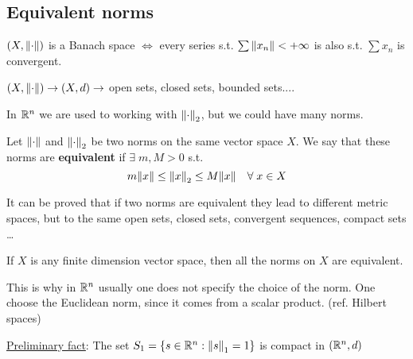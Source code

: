 \subsection{Equivalent norms}
\((X, \norm{\cdot})\) is a Banach space \(\Leftrightarrow\) every series s.t. \(\sum \norm{x_n} < +\infty\) is also s.t. \(\sum x_n\) is convergent.


\((X, \norm{\cdot}) \to (X, d) \to \) open sets, closed sets, bounded sets....

In \(\mathbb{R}^n\) we are used to working with \(\norm{\cdot}_2\), but we could have many norms.
\begin{definition}
    Let \(\norm{\cdot}\) and \(\norm{\cdot}_2\) be two norms on the same vector space \(X\). We say that these norms are \textbf{equivalent} if \(\exists \; m, M >0\) s.t. 
    \[
        m\norm{x} \leq \norm{x}_2 \leq M\norm{x} \quad \forall\; x \in X
    \]
\end{definition}
It can be proved that if two norms are equivalent they lead to different metric spaces, but to the same open sets, closed sets, convergent sequences, compact sets \dots
\begin{theorem}
    If \(X\) is any finite dimension vector space, then all the norms on \(X\) are equivalent.
\end{theorem}
\begin{remark}
    This is why in \(\mathbb{R}^n\) usually one does not specify the choice of the norm. One choose the Euclidean norm, since it comes from a scalar product. (ref. Hilbert spaces)
\end{remark}
\noindent\underline{Preliminary fact}: The set \(S_1 = \left\{ s \in \mathbb{R}^n : \norm{s}_1  = 1\right\}\) is compact in \((\mathbb{R}^n, d)\)
